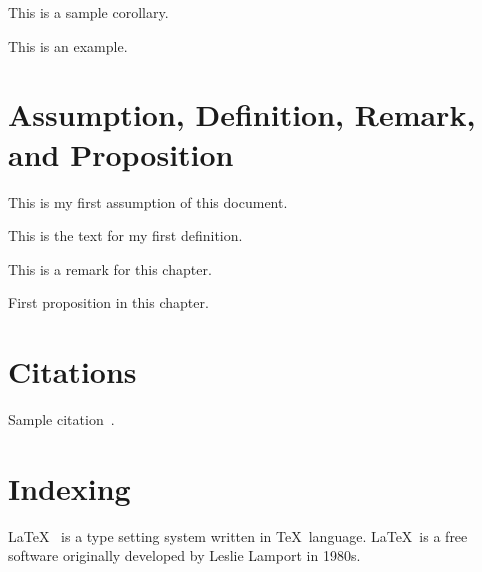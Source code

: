 \begin{corollary}
This is a sample corollary.
\end{corollary}

\begin{example}
  This is an example.
\end{example}

\section{Assumption, Definition, Remark, and Proposition}
\label{sec:assum}

\begin{assumption}
\label{asm:as1}
This is my first assumption of this document.
\end{assumption}

\begin{definition}
\label{def:def1}
This is the text for my first definition.
\end{definition}

\begin{remark}
\label{rem:rem1}
This is a remark for this chapter.
\end{remark}

\begin{proposition}
\label{prp:prop1}
First proposition in this chapter.
\end{proposition}

\section{Citations}\label{sec:citations}
Sample citation~\cite{lamport1994latex}.

\section{Indexing}\label{sec:indexing} \LaTeX\  is a 
type setting system written in \TeX\ language. \LaTeX\ 
is a free software originally developed by 
Leslie Lamport in 1980s. 



